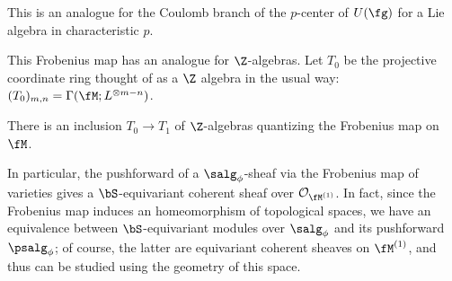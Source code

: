 {This is an analogue for the Coulomb branch of the  $p$-center of $U(\fg)$ for a Lie algebra in characteristic $p$.   

This Frobenius map has an analogue for $\Z$-algebras.  Let $T_0$ be the projective coordinate ring thought of as a $\Z$ algebra in the usual way: $(T_0)_{m,n}=\Gamma(\fM;L^{\otimes m-n})$.  
\begin{lemma}
  There is an inclusion $T_0\to T_1$ of $\Z$-algebras quantizing the Frobenius map on $\fM$. 
\end{lemma}
In particular, the pushforward of a $\salg_\phi$-sheaf via the
Frobenius map of varieties gives a $\bS$-equivariant coherent sheaf
over $\mathcal{O}_{\fM^{(1)}}$.  In fact, since the Frobenius map
induces an homeomorphism of topological spaces, we have an equivalence
between $\bS$-equivariant modules over $\salg_\phi$ and its
pushforward $\psalg_\phi$; of course, the latter are equivariant
coherent sheaves on $\fM^{(1)}$, and thus can be studied using the geometry of this space.}


